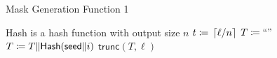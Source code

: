 \begin{algorithm}[t]
\caption{Mask Generation Function 1}
\label{alg:mgf1}
\begin{algorithmic}[1]
\Require \textsf{Hash} is a hash function with output size $n$
    \State $t \coloneqq{} \left\lceil \ell/n \right\rceil$
    \State $T \coloneqq{} \text{``''}$
        \State $T \coloneqq{} T\|\textsf{Hash}(\textsf{seed}\|i)$
    \EndFor
    \State \Return $\textsf{trunc}(T, \ell)$
\EndProcedure
\end{algorithmic}
\end{algorithm}
